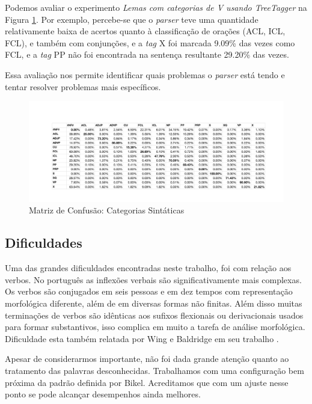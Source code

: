 Podemos avaliar o experimento \emph{Lemas com categorias de V usando TreeTagger} na Figura \ref{confusion_matrix_cat}. Por exemplo, percebe-se que o \emph{parser} teve uma quantidade relativamente baixa de acertos quanto à classificação de orações (ACL, ICL, FCL), e também com conjunções, e a \emph{tag} X foi marcada 9.09\% das vezes como FCL, e a \emph{tag} PP não foi encontrada na sentença resultante 29.20\% das vezes.

Essa avaliação nos permite identificar quais problemas o \emph{parser} está tendo e tentar resolver problemas mais específicos.

\begin{figure}[H]
  \begin{center}
	\includegraphics[scale=0.65]{score_confusion_cat.pdf}
	\caption{\label{confusion_matrix_cat} Matriz de Confusão: Categorias Sintáticas}		
  \end{center}
\end{figure}

\subsection{Dificuldades}
\label{sec:dificuldades}

Uma das grandes dificuldades encontradas neste trabalho, foi com relação aos verbos. No português as inflexões verbais são significativamente mais complexas. Os verbos são conjugados em seis pessoas e em dez tempos com representação morfológica diferente, além de em diversas formas não finitas. Além disso muitas terminações de verbos são idênticas aos sufixos flexionais ou derivacionais usados para formar substantivos, isso complica em muito a tarefa de análise morfológica. Dificuldade esta também relatada por Wing e Baldridge em seu trabalho \cite{baldridge06}.

Apesar de considerarmos importante, não foi dada grande atenção quanto ao tratamento das palavras desconhecidas. Trabalhamos com uma configuração bem próxima da padrão definida por Bikel. Acreditamos que com um ajuste nesse ponto se pode alcançar desempenhos ainda melhores.
